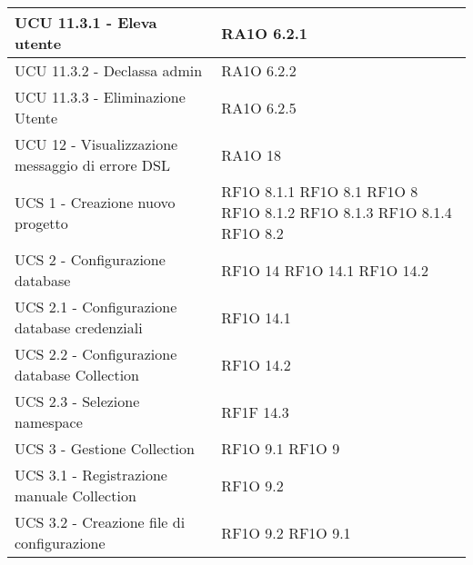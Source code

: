 \begin{center}
\begin{longtable}{ | p{5cm} | p{5cm} |}
            UCU 11.3.1 - Eleva utente &  RA1O 6.2.1 \newline  \\ \hline      
            UCU 11.3.2 - Declassa admin &  RA1O 6.2.2 \newline  \\ \hline      
            UCU 11.3.3 - Eliminazione Utente &  RA1O 6.2.5 \newline  \\ \hline      
            UCU 12 - Visualizzazione messaggio di errore DSL &  RA1O 18 \newline  \\ \hline      
            UCS 1 - Creazione nuovo progetto &  RF1O 8.1.1 \newline  RF1O 8.1  \newline  RF1O 8 \newline  RF1O 8.1.2 \newline  RF1O 8.1.3 \newline  RF1O 8.1.4 \newline  RF1O 8.2 \newline  \\ \hline      
            UCS 2 - Configurazione database &  RF1O 14 \newline  RF1O 14.1 \newline  RF1O 14.2 \newline  \\ \hline      
            UCS 2.1  - Configurazione database credenziali &  RF1O 14.1 \newline  \\ \hline      
            UCS 2.2  - Configurazione database Collection &  RF1O 14.2 \newline  \\ \hline      
            UCS 2.3  - Selezione namespace &  RF1F 14.3 \newline  \\ \hline      
            UCS 3 - Gestione Collection &  RF1O 9.1 \newline  RF1O 9 \newline  \\ \hline      
            UCS 3.1  - Registrazione manuale Collection &  RF1O 9.2 \newline  \\ \hline      
            UCS 3.2  - Creazione file di configurazione &  RF1O 9.2 \newline  RF1O 9.1 \newline  \\ \hline      

\end{longtable}
\end{center}
